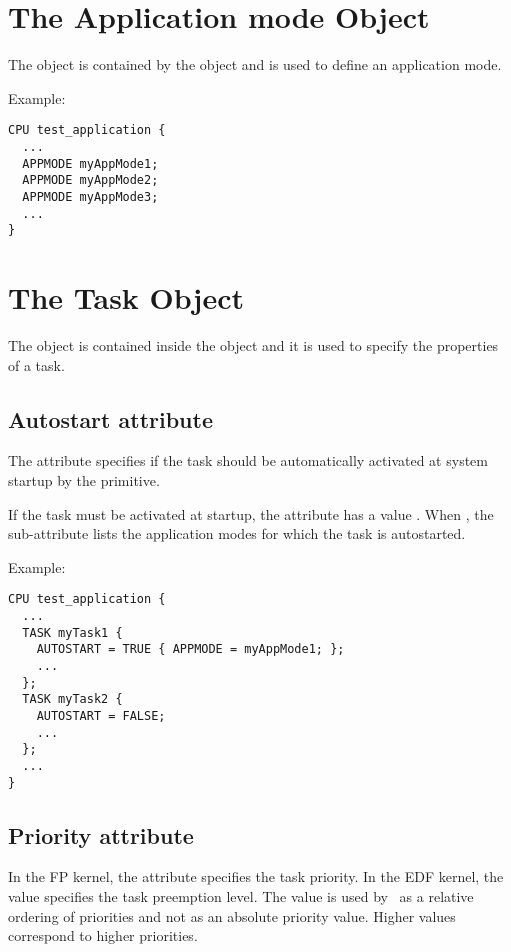 \section{The Application mode Object}
The  object is contained by the  object and is
used to define an application mode.

Example:

\begin{lstlisting}
CPU test_application {
  ...
  APPMODE myAppMode1;
  APPMODE myAppMode2;
  APPMODE myAppMode3;
  ...
}
\end{lstlisting}




\section{The Task Object}

The  object is contained inside the  object and it is used to specify the properties of a task.

\subsection{Autostart attribute}
The  attribute specifies if the task should be
automatically activated at system startup by the 
primitive.

If the task must be activated at startup, the 
attribute has a value . When , the
 sub-attribute lists the application modes for which
the task is autostarted.

Example:

\begin{lstlisting}
CPU test_application {
  ...
  TASK myTask1 {
    AUTOSTART = TRUE { APPMODE = myAppMode1; };
    ...
  };
  TASK myTask2 {
    AUTOSTART = FALSE;
    ...
  };
  ...
}
\end{lstlisting}

\subsection{Priority attribute}
In the FP kernel, the  attribute specifies the task
priority. In the EDF kernel, the value specifies the task preemption
level. The value is used by \rtd\ as a relative ordering of priorities
and not as an absolute priority value. Higher values correspond to
higher priorities.

